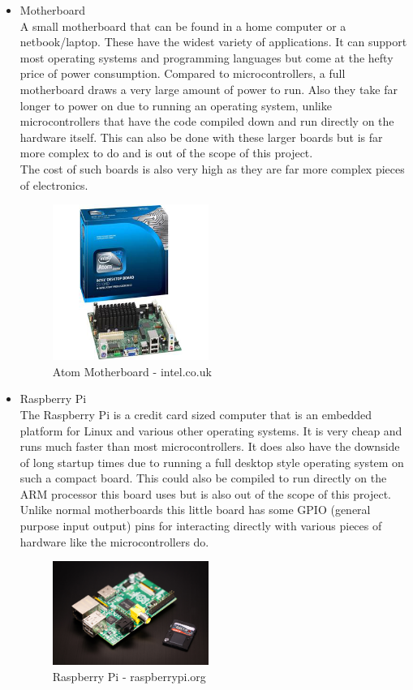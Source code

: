 \begin{itemize}
\item Motherboard
\\A small motherboard that can be found in a home computer or a netbook/laptop.  These have the widest variety of applications.  It can support most operating systems and programming languages but come at the hefty price of power consumption.  Compared to microcontrollers, a full motherboard draws a very large amount of power to run.  Also they take far longer to power on due to running an operating system, unlike microcontrollers that have the code compiled down and run directly on the hardware itself.  This can also be done with these larger boards but is far more complex to do and is out of the scope of this project.
\\The cost of such boards is also very high as they are far more complex pieces of electronics.
\begin{figure}[H]
\centering
        \includegraphics[width=2.0in] {Images/atom.jpg}
        \caption{Atom Motherboard - intel.co.uk}
        \label{Atom Motherboard}
\end{figure}
\item Raspberry Pi
\\The Raspberry Pi is a credit card sized computer that is an embedded platform for Linux and various other operating systems.  It is very cheap and runs much faster than most microcontrollers.  It does also have the downside of long startup times due to running a full desktop style operating system on such a compact board.  This could also be compiled to run directly on the ARM processor this board uses but is also out of the scope of this project.  Unlike normal motherboards this little board has some GPIO (general purpose input output) pins for interacting directly with various pieces of hardware like the microcontrollers do.
\begin{figure}[H]
\centering
        \includegraphics[width=2.0in] {Images/rpi.jpeg}
        \caption{Raspberry Pi - raspberrypi.org}
        \label{Raspberry Pi}
\end{figure}

\end{itemize}

